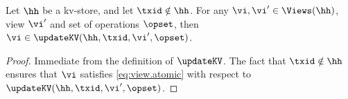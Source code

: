 \begin{itemize}
%

\end{itemize}

\begin{lemma}
\label{lem:updatekv.preserveviews}
Let $\hh$ be a kv-store, and let $\txid \notin \hh$. For any $\vi, \vi' \in \Views(\hh)$, 
view $\vi'$ and set of operations $\opset$, then $\vi \in \updateKV(\hh, \txid, \vi', \opset)$.
\end{lemma}

\begin{proof}
Immediate from the definition of $\updateKV$. The fact that $\txid \notin \hh$ ensures that 
$\vi$ satisfies \eqref{eq:view.atomic} with respect to $\updateKV(\hh, \txid, \vi', \opset)$.
\end{proof}

